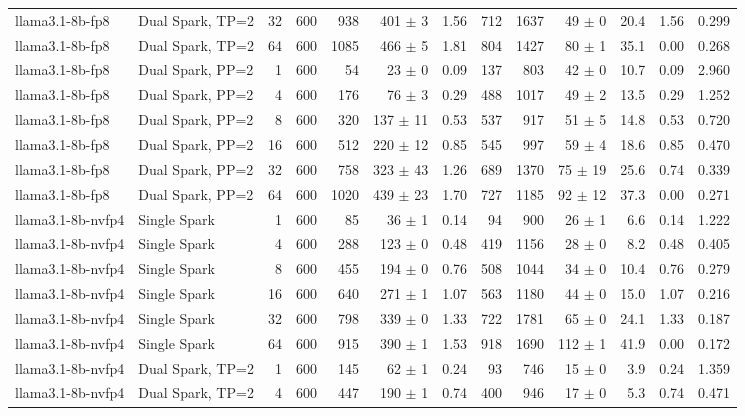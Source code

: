 \begin{tabular}{l l r r r r r r r r r r r}
llama3.1-8b-fp8 & Dual Spark, TP=2 & 32 & 600 & 938 & 401 $\pm$ 3 & 1.56 & 712 & 1637 & 49 $\pm$ 0 & 20.4 & 1.56 & 0.299 \\
llama3.1-8b-fp8 & Dual Spark, TP=2 & 64 & 600 & 1085 & 466 $\pm$ 5 & 1.81 & 804 & 1427 & 80 $\pm$ 1 & 35.1 & 0.00 & 0.268 \\
\addlinespace
llama3.1-8b-fp8 & Dual Spark, PP=2 & 1 & 600 & 54\rlap{$^\dagger$} & 23 $\pm$ 0 & 0.09 & 137 & 803 & 42 $\pm$ 0 & 10.7 & 0.09 & 2.960 \\
llama3.1-8b-fp8 & Dual Spark, PP=2 & 4 & 600 & 176 & 76 $\pm$ 3 & 0.29 & 488 & 1017 & 49 $\pm$ 2 & 13.5 & 0.29 & 1.252 \\
llama3.1-8b-fp8 & Dual Spark, PP=2 & 8 & 600 & 320 & 137 $\pm$ 11 & 0.53 & 537 & 917 & 51 $\pm$ 5 & 14.8 & 0.53 & 0.720 \\
llama3.1-8b-fp8 & Dual Spark, PP=2 & 16 & 600 & 512 & 220 $\pm$ 12 & 0.85 & 545 & 997 & 59 $\pm$ 4 & 18.6 & 0.85 & 0.470 \\
llama3.1-8b-fp8 & Dual Spark, PP=2 & 32 & 600 & 758 & 323 $\pm$ 43 & 1.26 & 689 & 1370 & 75 $\pm$ 19 & 25.6 & 0.74 & 0.339 \\
llama3.1-8b-fp8 & Dual Spark, PP=2 & 64 & 600 & 1020 & 439 $\pm$ 23 & 1.70 & 727 & 1185 & 92 $\pm$ 12 & 37.3 & 0.00 & 0.271 \\
\addlinespace
llama3.1-8b-nvfp4 & Single Spark & 1 & 600 & 85\rlap{$^\dagger$} & 36 $\pm$ 1 & 0.14 & 94 & 900 & 26 $\pm$ 1 & 6.6 & 0.14 & 1.222 \\
llama3.1-8b-nvfp4 & Single Spark & 4 & 600 & 288 & 123 $\pm$ 0 & 0.48 & 419 & 1156 & 28 $\pm$ 0 & 8.2 & 0.48 & 0.405 \\
llama3.1-8b-nvfp4 & Single Spark & 8 & 600 & 455 & 194 $\pm$ 0 & 0.76 & 508 & 1044 & 34 $\pm$ 0 & 10.4 & 0.76 & 0.279 \\
llama3.1-8b-nvfp4 & Single Spark & 16 & 600 & 640 & 271 $\pm$ 1 & 1.07 & 563 & 1180 & 44 $\pm$ 0 & 15.0 & 1.07 & 0.216 \\
llama3.1-8b-nvfp4 & Single Spark & 32 & 600 & 798 & 339 $\pm$ 0 & 1.33 & 722 & 1781 & 65 $\pm$ 0 & 24.1 & 1.33 & 0.187 \\
llama3.1-8b-nvfp4 & Single Spark & 64 & 600 & 915 & 390 $\pm$ 1 & 1.53 & 918 & 1690 & 112 $\pm$ 1 & 41.9 & 0.00 & 0.172 \\
\addlinespace
llama3.1-8b-nvfp4 & Dual Spark, TP=2 & 1 & 600 & 145 & 62 $\pm$ 1 & 0.24 & 93 & 746 & 15 $\pm$ 0 & 3.9 & 0.24 & 1.359 \\
llama3.1-8b-nvfp4 & Dual Spark, TP=2 & 4 & 600 & 447 & 190 $\pm$ 1 & 0.74 & 400 & 946 & 17 $\pm$ 0 & 5.3 & 0.74 & 0.471 \\

\end{tabular}
